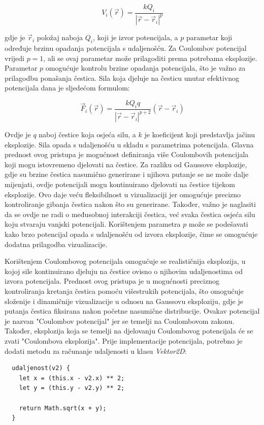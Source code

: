 \documentclass{foi}
\begin{document}
\[
V_i(\vec{r}) = \frac{k Q_i}{|\vec{r} - \vec{r}_i|^p}
\]

gdje je \(\vec{r}_i\) položaj naboja \(Q_i\), koji je izvor potencijala, a \(p\) parametar koji određuje brzinu opadanja potencijala s udaljenošću. Za Coulombov potencijal vrijedi \(p = 1\), ali se ovaj parametar može prilagoditi prema potrebama eksplozije. Parametar \(p\) omogućuje kontrolu brzine opadanja potencijala, što je važno za prilagodbu ponašanja čestica. Sila koja djeluje na česticu unutar efektivnog potencijala dana je sljedećom formulom:

\[
\vec{F}_i(\vec{r}) = \frac{k Q_i q}{|\vec{r} - \vec{r}_i|^{p+2}} (\vec{r} - \vec{r}_i)
\]

Ovdje je \(q\) naboj čestice koja osjeća silu, a \(k\) je koeficijent koji predstavlja jačinu eksplozije. Sila opada s udaljenošću u skladu s parametrima potencijala. Glavna prednost ovog pristupa je mogućnost definiranja više Coulombovih potencijala koji mogu istovremeno djelovati na čestice. Za razliku od Gaussove eksplozije, gdje su brzine čestica nasumično generirane i njihova putanje se ne može dalje mijenjati, ovdje potencijali mogu kontinuirano djelovati na čestice tijekom eksplozije. Ovo daje veću fleksibilnost u vizualizaciji jer omogućuje precizno kontroliranje gibanja čestica nakon što su generirane. Također, važno je naglasiti da se ovdje ne radi o međusobnoj interakciji čestica, već svaka čestica osjeća silu koju stvaraju vanjski potencijali. Korištenjem parametra \(p\) može se  podešavati kako brzo potencijal opada s udaljenošću od izvora eksplozije, čime se omogućuje dodatna prilagodba vizualizacije.

Korištenjem Coulombovog potencijala omogućuje se realističnija eksplozija, u kojoj sile kontinuirano djeluju na čestice ovisno o njihovim udaljenostima od izvora potencijala. Prednost ovog pristupa je u mogućnosti preciznog kontroliranja kretanja čestica pomoću višestrukih potencijala, što omogućuje složenije i dinamičnije vizualizacije u odnosu na Gaussovu eksploziju, gdje je putanja čestica fiksirana nakon početne nasumične distribucije. Ovakav potencijal je nazvan "Coulombov potencijal" jer se temelji na Coulombovom zakonu. Također, eksplozija koja se temelji na djelovanju Coulombovog potencijala će se zvati "Coulombova eksplozija". Prije implementacije potencijala, potrebno je dodati metodu za računanje udaljenosti u klasu \textit{Vektor2D}:

\begin{verbatim}
  udaljenost(v2) {
    let x = (this.x - v2.x) ** 2;
    let y = (this.y - v2.y) ** 2;

    return Math.sqrt(x + y);
  }
\end{verbatim}
\end{document}
